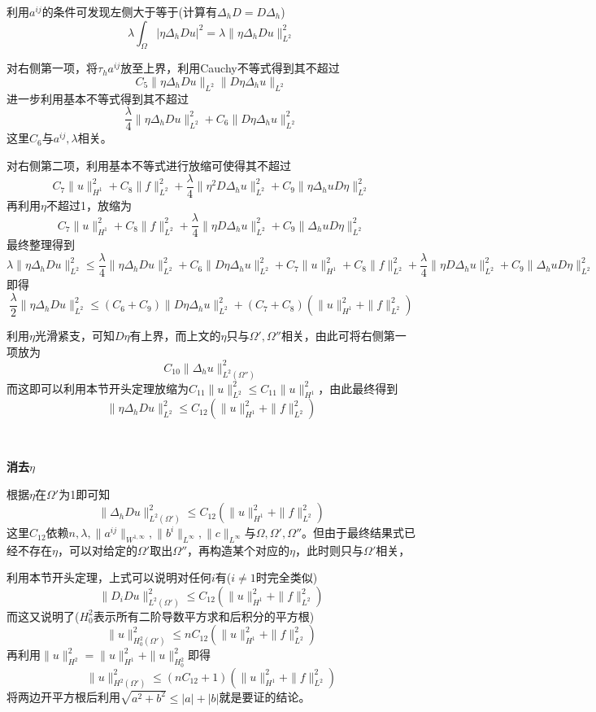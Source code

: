 \documentclass[a4paper,UTF8,fontset=windows,AutoFakeBold]{ctexart}
\begin{document}
{    利用$a^{ij}$的条件可发现左侧大于等于(计算有$\Delta_hD=D\Delta_h$)
    $$\lambda\int_\Omega|\eta\Delta_hDu|^2=\lambda\|\eta\Delta_hDu\|_{L^2}^2$$

    对右侧第一项，将$\tau_ha^{ij}$放至上界，利用Cauchy不等式得到其不超过
    $$C_5\|\eta\Delta_hDu\|_{L^2}\|D\eta\Delta_h u\|_{L^2}$$
    进一步利用基本不等式得到其不超过
    $$\frac{\lambda}{4}\|\eta\Delta_hDu\|_{L^2}^2+C_6\|D\eta\Delta_h u\|_{L^2}^2$$
    这里$C_6$与$a^{ij},\lambda$相关。

    对右侧第二项，利用基本不等式进行放缩可使得其不超过
    $$C_7\|u\|_{H^1}^2+C_8\|f\|_{L^2}^2+\frac{\lambda}{4}\|\eta^2D\Delta_hu\|_{L^2}^2+C_9\|\eta\Delta_huD\eta\|_{L^2}^2$$
    再利用$\eta$不超过1，放缩为
    $$C_7\|u\|_{H^1}^2+C_8\|f\|_{L^2}^2+\frac{\lambda}{4}\|\eta D\Delta_hu\|_{L^2}^2+C_9\|\Delta_huD\eta\|_{L^2}^2$$
    最终整理得到
    $$\lambda\|\eta\Delta_hDu\|_{L^2}^2\le \frac{\lambda}{4}\|\eta\Delta_hDu\|_{L^2}^2+C_6\|D\eta\Delta_h u\|_{L^2}^2+C_7\|u\|_{H^1}^2+C_8\|f\|_{L^2}^2+\frac{\lambda}{4}\|\eta D\Delta_hu\|_{L^2}^2+C_9\|\Delta_huD\eta\|_{L^2}^2$$
    即得
    $$\frac{\lambda}{2}\|\eta\Delta_hDu\|_{L^2}^2\le(C_6+C_9)\|D\eta\Delta_h u\|_{L^2}^2+(C_7+C_8)(\|u\|_{H^1}^2+\|f\|_{L^2}^2)$$

    利用$\eta$光滑紧支，可知$D\eta$有上界，而上文的$\eta$只与$\Omega',\Omega''$相关，由此可将右侧第一项放为
    $$C_{10}\|\Delta_hu\|_{L^2(\Omega'')}^2$$
    而这即可以利用本节开头定理放缩为$C_{11}\|u\|_{L^2}^2\le C_{11}\|u\|_{H^1}^2$，由此最终得到
    $$\|\eta\Delta_hDu\|_{L^2}^2\le C_{12}(\|u\|_{H^1}^2+\|f\|_{L^2}^2)$$

    \

    \textbf{消去$\eta$}

    根据$\eta$在$\Omega'$为1即可知
    $$\|\Delta_hDu\|_{L^2(\Omega')}^2\le C_{12}(\|u\|_{H^1}^2+\|f\|_{L^2}^2)$$
    这里$C_{12}$依赖$n,\lambda,\|a^{ij}\|_{W^{1,\infty}},\|b^i\|_{L^\infty},\|c\|_{L^\infty}$与$\Omega,\Omega',\Omega''$。但由于最终结果式已经不存在$\eta$，可以对给定的$\Omega'$取出$\Omega''$，再构造某个对应的$\eta$，此时则只与$\Omega'$相关，

    利用本节开头定理，上式可以说明对任何$i$有($i\ne1$时完全类似)
    $$\|D_iDu\|_{L^2(\Omega')}^2\le C_{12}(\|u\|_{H^1}^2+\|f\|_{L^2}^2)$$
    而这又说明了($H_0^2$表示所有二阶导数平方求和后积分的平方根)
    $$\|u\|_{H_0^2(\Omega')}^2\le nC_{12}(\|u\|_{H^1}^2+\|f\|_{L^2}^2)$$
    再利用$\|u\|_{H^2}^2=\|u\|_{H^1}^2+\|u\|_{H_0^2}^2$即得
    $$\|u\|_{H^2(\Omega')}^2\le(nC_{12}+1)(\|u\|_{H^1}^2+\|f\|_{L^2}^2)$$
    将两边开平方根后利用$\sqrt{a^2+b^2}\le|a|+|b|$就是要证的结论。
}
\end{document}
